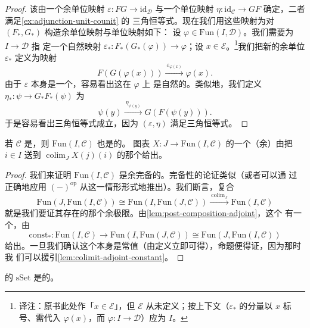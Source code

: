\begin{proof}
该\trAdjunction{}由一个余单位映射 $\varepsilon\colon FG \to \mathrm{id}_{\mathcal{D}}$
与一个单位映射 $\eta\colon \mathrm{id}_{\mathcal{C}} \to GF$ 确定，二者满足\cref{ex:adjunction-unit-counit} 的
三角恒等式。现在我们用这些映射为\trFunctor{}对 $(F_*, G_*)$ 构造余单位映射与单位映射如下：
设 $\varphi \in \mathrm{Fun}(I,\mathcal{D})$。我们需要为\trFunctor{} $I \to \mathcal{D}$ 指
定一个自然映射 $\varepsilon_*\colon F_*(G_*(\varphi)) \to \varphi$；设
$x \in \mathcal{E}$。\footnote{译注：原书此处作「$x \in \mathcal{E}$」，但
$\mathcal{E}$ 从未定义；按上下文（$\varepsilon_*$ 的分量以 $x$ 标号、需代入
$\varphi(x)$，而 $\varphi\colon I \to \mathcal{D}$）应为 $I$。}我们把新的余单位 $\varepsilon_*$
定义为映射
\[
F(G(\varphi(x))) \xrightarrow{\ \varepsilon_{\varphi(x)}\ } \varphi(x).
\]
由于 $\varepsilon$ 本身是一个\trNaturalTransformation{}，容易看出这在 $\varphi$ 上
是自然的。类似地，我们定义\trNaturalTransformation{}%
$\eta_*\colon \psi \to G_*F_*(\psi)$ 为
\[
\psi(y) \xrightarrow{\ \eta_{\psi(y)}\ } G(F(\psi(y))).
\]
于是容易看出三角恒等式成立，因为 $(\varepsilon, \eta)$ 满足三角恒等式。
\end{proof}
\begin{proposition}\label{prop:functor-category-bicomplete}
若 $\mathcal{C}$ 是\trBicomplete{}\trCategory{}，则 $\mathrm{Fun}(I,\mathcal{C})$ 也是\trBicomplete{}的。
图表 $X\colon J \to \mathrm{Fun}(I,\mathcal{C})$ 的一个（余）\trLimit{}由把
$i \in I$ 送到 $\operatorname{colim}_J X(j)(i)$ 的那个\trFunctor{}给出。
\end{proposition}

\begin{proof}
我们来证明 $\mathrm{Fun}(I,\mathcal{C})$ 是余完备的。完备性的论证类似（或者可以通
过正确地应用\trFunctor{} $(-)^{\mathrm{op}}$ 从这一情形形式地推出）。我们断言，复合
\[
\mathrm{Fun}(J,\mathrm{Fun}(I,\mathcal{C})) \cong
\mathrm{Fun}(I,\mathrm{Fun}(J,\mathcal{C}))
\xrightarrow{\ \operatorname{colim}_J\ }
\mathrm{Fun}(I,\mathcal{C})
\]
就是我们要证其存在的那个余极限\trFunctor{}。由\cref{lem:post-composition-adjoint}，这个\trFunctor{}%
有一个\trRightAdjoint{}，由
\[
\mathrm{const}_*\colon \mathrm{Fun}(I,\mathcal{C}) \to
\mathrm{Fun}(I,\mathrm{Fun}(J,\mathcal{C})) \cong
\mathrm{Fun}(J,\mathrm{Fun}(I,\mathcal{C}))
\]
给出。一旦我们确认这个\trFunctor{}本身是常值\trFunctor{}（由定义立即可得），命题便得证，因为那时我
们可以援引\cref{lem:colimit-adjoint-constant}。
\end{proof}

\begin{corollary}\label{cor:sset-bicomplete}
\trSimplicialSet{}的\trCategory{} $\mathrm{sSet}$ 是\trBicomplete{}的。
\end{corollary}

